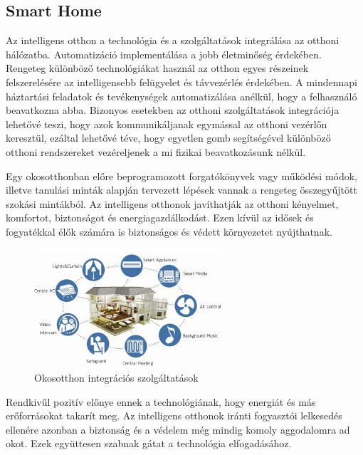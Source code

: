 \subsection{Smart Home}
Az intelligens otthon a technológia és a szolgáltatások integrálása az otthoni hálózatba. Automatizáció implementálása a jobb életminőség érdekében. Rengeteg különböző technológiákat használ az otthon egyes részeinek felszerelésére az intelligensebb felügyelet és távvezérlés érdekében. A mindennapi háztartási feladatok és tevékenységek automatizálása anélkül, hogy a felhasználó beavatkozna abba. Bizonyos esetekben az otthoni szolgáltatások integrációja lehetővé teszi, hogy azok kommunikáljanak egymással az otthoni vezérlőn keresztül, ezáltal lehetővé téve, hogy egyetlen gomb segítségével különböző otthoni rendszereket vezéreljenek a mi fizikai beavatkozásunk nélkül.
\par Egy okosotthonban előre beprogramozott forgatókönyvek vagy működési módok, illetve tanulási minták alapján tervezett lépések vannak a rengeteg összegyűjtött szokási mintákból. Az intelligens otthonok javíthatják az otthoni kényelmet, komfortot, biztonságot és energiagazdálkodást. Ezen kívül az idősek és fogyatékkal élők számára is biztonságos és védett környezetet nyújthatnak.\cite{smart-home-technology}
\begin{figure}[!ht]
    \centering
    \includegraphics[width=70mm, keepaspectratio]{figures/smart-home.jpg}
    \caption{Okosotthon integrációs szolgáltatások}
\end{figure}
\par Rendkivűl pozitív előnye ennek a technológiának, hogy energiát és más erőforrásokat takarít meg. Az intelligens otthonok iránti fogyasztói lelkesedés ellenére azonban a biztonság és a védelem még mindig komoly aggodalomra ad okot. Ezek együttesen szabnak gátat a technológia elfogadásához.

